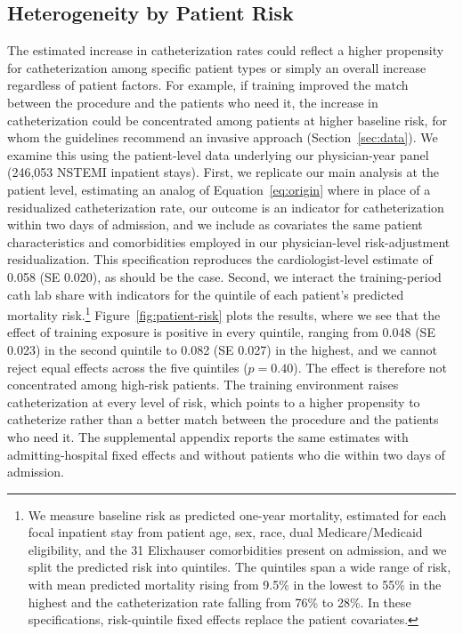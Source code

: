 \documentclass[12pt]{article}
\begin{document}
\subsection{Heterogeneity by Patient Risk}\label{sec:imprint-risk}

The estimated increase in catheterization rates could reflect a higher propensity for catheterization among specific patient types or simply an overall increase regardless of patient factors. For example, if training improved the match between the procedure and the patients who need it, the increase in catheterization could be concentrated among patients at higher baseline risk, for whom the guidelines recommend an invasive approach (Section~\ref{sec:data}). We examine this using the patient-level data underlying our physician-year panel (246,053 NSTEMI inpatient stays). First, we replicate our main analysis at the patient level, estimating an analog of Equation~\eqref{eq:origin} where in place of a residualized catheterization rate, our outcome is an indicator for catheterization within two days of admission, and we include as covariates the same patient characteristics and comorbidities employed in our physician-level risk-adjustment residualization. This specification reproduces the cardiologist-level estimate of 0.058 (SE 0.020), as should be the case. Second, we interact the training-period cath lab share with indicators for the quintile of each patient's predicted mortality risk.\footnote{We measure baseline risk as predicted one-year mortality, estimated for each focal inpatient stay from patient age, sex, race, dual Medicare/Medicaid eligibility, and the 31 Elixhauser comorbidities present on admission, and we split the predicted risk into quintiles. The quintiles span a wide range of risk, with mean predicted mortality rising from 9.5\% in the lowest to 55\% in the highest and the catheterization rate falling from 76\% to 28\%. In these specifications, risk-quintile fixed effects replace the patient covariates.} Figure~\ref{fig:patient-risk} plots the results, where we see that the effect of training exposure is positive in every quintile, ranging from 0.048 (SE 0.023) in the second quintile to 0.082 (SE 0.027) in the highest, and we cannot reject equal effects across the five quintiles ($p = 0.40$). The effect is therefore not concentrated among high-risk patients. The training environment raises catheterization at every level of risk, which points to a higher propensity to catheterize rather than a better match between the procedure and the patients who need it. The supplemental appendix reports the same estimates with admitting-hospital fixed effects and without patients who die within two days of admission.
\end{document}
